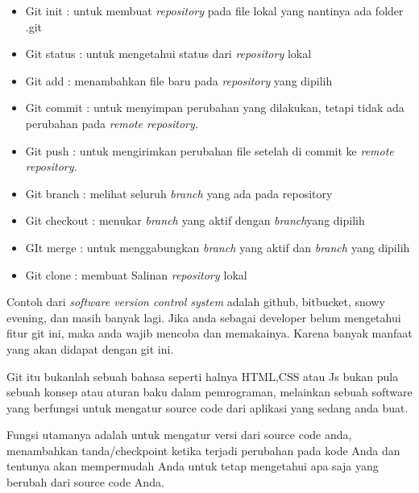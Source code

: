 \begin{itemize}
\item Git init : untuk membuat $  $\textit{repository} $  $pada file lokal yang nantinya ada folder .git \par
\noindent 
\item Git status : untuk mengetahui status dari $  $\textit{repository} $  $lokal \par
\noindent 
\item Git add : menambahkan file baru pada $  $\textit{repository} $  $yang dipilih \par
\noindent 
\item Git commit : untuk menyimpan perubahan yang dilakukan, tetapi tidak ada perubahan pada $  $\textit{remote repository.} \par
\noindent 
\item Git push : untuk mengirimkan perubahan file setelah di commit ke $  $\textit{remote repository.} \par
\noindent 
\item Git branch : melihat seluruh $  $\textit{branch $  $}yang ada pada repository \par
\noindent 
\item Git checkout : menukar $  $\textit{branch $  $}yang aktif dengan $  $\textit{branch}yang dipilih \par
\noindent 
\item GIt merge : untuk menggabungkan $  $\textit{branch $  $}yang aktif dan $  $\textit{branch $  $}yang dipilih \par
\noindent 
\item Git clone : membuat Salinan $  $\textit{repository $  $}lokal\end{itemize}
 \par
\noindent 
Contoh dari $  $\textit{software version control system} $  $adalah github, bitbucket, snowy evening, dan masih banyak lagi. Jika anda sebagai developer belum mengetahui fitur git ini, maka anda wajib mencoba dan memakainya. Karena banyak manfaat yang akan didapat dengan git ini. \par
\noindent 
Git itu bukanlah sebuah bahasa seperti halnya HTML,CSS atau Js bukan pula sebuah konsep atau aturan baku dalam pemrograman, melainkan sebuah software yang berfungsi untuk mengatur source code dari aplikasi yang sedang anda buat. \par
\vspace{12pt}
\noindent 
Fungsi utamanya adalah untuk mengatur versi dari source code anda, menambahkan tanda/checkpoint ketika terjadi perubahan pada kode Anda dan tentunya akan mempermudah Anda untuk tetap mengetahui apa saja yang berubah dari source code Anda. \par

